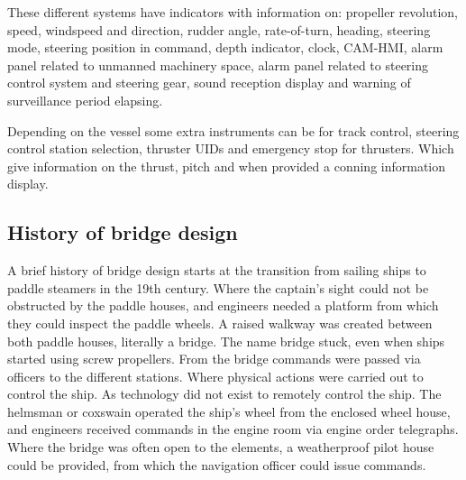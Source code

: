 These different systems have indicators with information on: propeller revolution, speed, windspeed and direction, rudder angle, rate-of-turn, heading, steering mode, steering position in command, depth indicator, clock, \ac{CAM-HMI}, alarm panel related to unmanned machinery space, alarm panel related to steering control system and steering gear, sound reception display and warning of surveillance period elapsing. 

Depending on the vessel some extra instruments can be for track control, steering control station selection, thruster \ac{UID}s and emergency stop for thrusters. Which give information on the thrust, pitch and when provided a conning information display. \cite{DNVGL2017}


\subsection{History of bridge design}
A brief history of bridge design starts at the transition from sailing ships to paddle steamers in the 19th century. Where the captain's sight could not be obstructed by the paddle houses, and engineers needed a platform from which they could inspect the paddle wheels. A raised walkway was created between both paddle houses, literally a bridge. The name bridge stuck, even when ships started using screw propellers. From the bridge commands were passed via officers to the different stations. Where physical actions were carried out to control the ship. As technology did not exist to remotely control the ship. The helmsman or coxswain operated the ship's wheel from the enclosed wheel house, and engineers received commands in the engine room via engine order telegraphs. Where the bridge was often open to the elements, a weatherproof pilot house could be provided, from which the navigation officer could issue commands.

